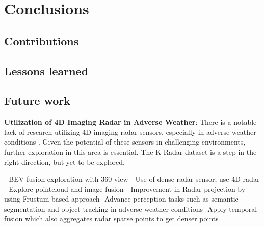 \documentclass[report.tex]{subfiles}
\begin{document}
    \chapter{Conclusions}

    \section{Contributions}

    \section{Lessons learned}

    \section{Future work}

    \textbf{Utilization of 4D Imaging Radar in Adverse Weather}: There is a notable lack of research utilizing 4D imaging radar sensors, especially in adverse weather conditions \cite{Zhou2022May}. Given the potential of these sensors in challenging environments, further exploration in this area is essential. The K-Radar dataset \cite{Paek2022Jun} is a step in the right direction, but yet to be explored.

    - BEV fusion exploration with 360 view
    - Use of dense radar sensor, use 4D radar
    - Explore pointcloud and image fusion
    - Improvement in Radar projection by using Frustum-based approach
    -Advance perception tasks such as semantic segmentation and object tracking in adverse weather conditions
    -Apply temporal fusion which also aggregates radar sparse points to get denser points
    
\end{document}
